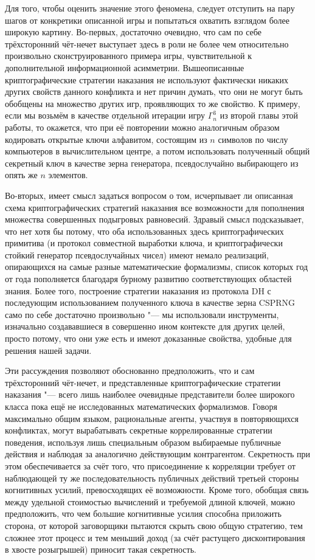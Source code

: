 Для того, чтобы оценить значение этого феномена, следует отступить на пару шагов от конкретики описанной игры и попытаться охватить взглядом более широкую картину. Во-первых, достаточно очевидно, что сам по себе трёхсторонний чёт-нечет выступает здесь в роли не более чем относительно произвольно сконструированного примера игры, чувствительной к дополнительной информационной асимметрии. Вышеописанные криптографические стратегии наказания не используют фактически никаких других свойств данного конфликта и нет причин думать, что они не могут быть обобщены на множество других игр, проявляющих то же свойство. К примеру, если мы возьмём в качестве отдельной итерации игру $\Gamma^3_n$ из второй главы этой работы, то окажется, что при её повторении можно аналогичным образом кодировать открытые ключи алфавитом, состоящим из $n$ символов по числу компьютеров в вычислительном центре, а потом использовать полученный общий секретный ключ в качестве зерна генератора, псевдослучайно выбирающего из опять же $n$ элементов.

Во-вторых, имеет смысл задаться вопросом о том, исчерпывает ли описанная схема криптографических стратегий наказания все возможности для пополнения множества совершенных подыгровых равновесий. Здравый смысл подсказывает, что нет хотя бы потому, что оба использованных здесь криптографических примитива (и протокол совместной выработки ключа, и криптографически стойкий генератор псевдослучайных чисел) имеют немало реализаций, опирающихся на самые разные математические формализмы, список которых год от года пополняется благодаря бурному развитию соответствующих областей знания. Более того, построение стратегии наказания из протокола DH с последующим использованием полученного ключа в качестве зерна CSPRNG само по себе достаточно произвольно "--- мы использовали инструменты, изначально создававшиеся в совершенно ином контексте для других целей, просто потому, что они уже есть и имеют доказанные свойства, удобные для решения нашей задачи.

Эти рассуждения позволяют обоснованно предположить, что и сам трёхсторонний чёт-нечет, и представленные криптографические стратегии наказания "--- всего лишь наиболее очевидные представители более широкого класса пока ещё не исследованных математических формализмов. Говоря максимально общим языком, рациональные агенты, участвуя в повторяющихся конфликтах, могут вырабатывать секретные коррелированные стратегии поведения, используя лишь специальным образом выбираемые публичные действия и наблюдая за аналогично действующим контрагентом. Секретность при этом обеспечивается за счёт того, что присоединение к корреляции требует от наблюдающей ту же последовательность публичных действий третьей стороны когнитивных усилий, превосходящих её возможности. Кроме того, обобщая связь между удельной стоимостью вычислений и требуемой длиной ключей, можно предположить, что чем большие когнитивные усилия способна приложить сторона, от которой заговорщики пытаются скрыть свою общую стратегию, тем сложнее этот процесс и тем меньший доход (за счёт растущего дисконтирования в хвосте розыгрышей) приносит такая секретность.

